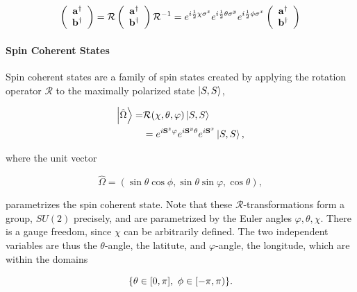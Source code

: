 \documentclass{homework}
\begin{document}
\begin{equation}
    \left(\begin{array}{c}
         {\bf a}^\dagger  \\
         {\bf b}^\dagger
    \end{array}\right) = \mathcal{R} \left(\begin{array}{c}
         {\bf a}^\dagger  \\
         {\bf b}^\dagger
    \end{array}\right) \mathcal{R}^{-1} = e^{i \frac{1}{2} \chi \sigma^z} e^{i \frac{1}{2} \theta \sigma^y} e^{i \frac{1}{2} \phi \sigma^x} \left(\begin{array}{c}
         {\bf a}^\dagger  \\
         {\bf b}^\dagger
    \end{array}\right)
    \label{Schwinger_bosons_are_su2vectors}
\end{equation}

\paragraph{Spin Coherent States}

Spin coherent states are a family of spin states created by applying the rotation operator $\mathcal{R}$ to the maximally polarized state $\ket{S,S}$,

\begin{equation}
\begin{split}
    \ket{\hat{\Omega}} =& \mathcal{R}(\chi, \theta, \varphi) \ket{S,S} \\
    &= e^{i{\bf S}^z \varphi} e^{i {\bf S}^y \theta} e^{i {\bf S}^x} \ket{S,S},
\end{split}
\end{equation}

where the unit vector 

\begin{equation}
    \hat{\Omega} = (\sin \theta \cos \phi, \sin \theta \sin \varphi, \cos \theta),
\end{equation}

parametrizes the spin coherent state. Note that these $\mathcal{R}$-transformations form a group, $SU(2)$ precisely, and are parametrized by the Euler angles $\varphi, \theta, \chi$. There is a gauge freedom, since $\chi$ can be arbitrarily defined. The two independent variables are thus the $\theta$-angle, the latitute, and $\varphi$-angle, the longitude, which are within the domains 

$$
    \{\theta \in [0, \pi], \textnormal{ } \phi \in [-\pi, \pi) \}.
$$
\end{document}
